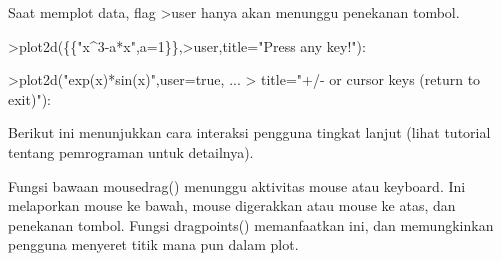 \documentclass[a4paper,10pt]{article}
\begin{document}
\begin{eulernotebook}
\begin{eulercomment}
\begin{eulercomment}
\begin{eulercomment}
\begin{eulercomment}
\begin{eulercomment}
\begin{eulercomment}
\begin{eulercomment}
\begin{eulercomment}
\begin{eulercomment}
\begin{eulercomment}
\begin{eulercomment}
\begin{eulercomment}
\begin{eulercomment}
\begin{eulercomment}
\begin{eulercomment}
\begin{eulercomment}
\begin{eulercomment}
\begin{eulercomment}
\begin{eulercomment}
\begin{eulercomment}
\begin{eulercomment}
\begin{eulercomment}
\begin{eulercomment}
\begin{eulercomment}
\begin{eulercomment}
\begin{eulercomment}
\begin{eulercomment}
\begin{eulercomment}
\begin{eulercomment}
\begin{eulercomment}
\begin{eulercomment}
\begin{eulercomment}
\begin{eulercomment}
\begin{eulercomment}
\begin{eulercomment}
\begin{eulercomment}
\begin{eulercomment}
Saat memplot data, flag \textgreater{}user hanya akan menunggu penekanan tombol.
\end{eulercomment}
\begin{eulerprompt}
>plot2d(\{\{"x^3-a*x",a=1\}\},>user,title="Press any key!"):
\end{eulerprompt}
\begin{eulerprompt}
>plot2d("exp(x)*sin(x)",user=true, ...
>  title="+/- or cursor keys (return to exit)"):
\end{eulerprompt}
\begin{eulercomment}
Berikut ini menunjukkan cara interaksi pengguna tingkat lanjut (lihat
tutorial tentang pemrograman untuk detailnya).

Fungsi bawaan mousedrag() menunggu aktivitas mouse atau keyboard. Ini
melaporkan mouse ke bawah, mouse digerakkan atau mouse ke atas, dan
penekanan tombol. Fungsi dragpoints() memanfaatkan ini, dan
memungkinkan pengguna menyeret titik mana pun dalam plot.


\end{eulercomment}
\end{eulercomment}
\end{eulercomment}
\end{eulercomment}
\end{eulercomment}
\end{eulercomment}
\end{eulercomment}
\end{eulercomment}
\end{eulercomment}
\end{eulercomment}
\end{eulercomment}
\end{eulercomment}
\end{eulercomment}
\end{eulercomment}
\end{eulercomment}
\end{eulercomment}
\end{eulercomment}
\end{eulercomment}
\end{eulercomment}
\end{eulercomment}
\end{eulercomment}
\end{eulercomment}
\end{eulercomment}
\end{eulercomment}
\end{eulercomment}
\end{eulercomment}
\end{eulercomment}
\end{eulercomment}
\end{eulercomment}
\end{eulercomment}
\end{eulercomment}
\end{eulercomment}
\end{eulercomment}
\end{eulercomment}
\end{eulercomment}
\end{eulercomment}
\end{eulercomment}
\end{eulernotebook}
\end{document}
